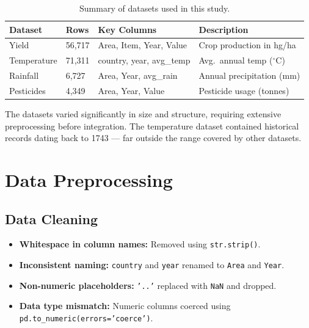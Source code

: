 \documentclass[12pt,a4paper]{article}
\begin{document}
\begin{table}[H]
\centering
\caption{Summary of datasets used in this study.}
\label{tab:datasets}
\renewcommand{\arraystretch}{1.35}
\begin{tabularx}{\textwidth}{L{3cm} C{2cm} L{3.5cm} X}
\toprule
{}
\color{white}\textbf{Dataset} &
\color{white}\textbf{Rows} &
\color{white}\textbf{Key Columns} &
\color{white}\textbf{Description} \\
\midrule
{}
Yield          & 56,717 & Area, Item, Year, Value   & Crop production in hg/ha \\
Temperature    & 71,311 & country, year, avg\_temp  & Avg.\ annual temp ($^\circ$C) \\
Rainfall       & 6,727  & Area, Year, avg\_rain     & Annual precipitation (mm) \\
Pesticides     & 4,349  & Area, Year, Value         & Pesticide usage (tonnes) \\
\bottomrule
\end{tabularx}
\end{table}

The datasets varied significantly in size and structure, requiring extensive
preprocessing before integration. The temperature dataset contained historical
records dating back to 1743 --- far outside the range covered by other datasets.

\section{Data Preprocessing}

\subsection{Data Cleaning}

\begin{itemize}[leftmargin=2em]
  \item \textbf{Whitespace in column names:} Removed using \texttt{str.strip()}.
  \item \textbf{Inconsistent naming:} \texttt{country} and \texttt{year} renamed to
        \texttt{Area} and \texttt{Year}.
  \item \textbf{Non-numeric placeholders:} \texttt{'..'} replaced with \texttt{NaN}
        and dropped.
  \item \textbf{Data type mismatch:} Numeric columns coerced using
        \texttt{pd.to\_numeric(\allowbreak errors=\allowbreak'coerce')}.
\end{itemize}
\end{document}
